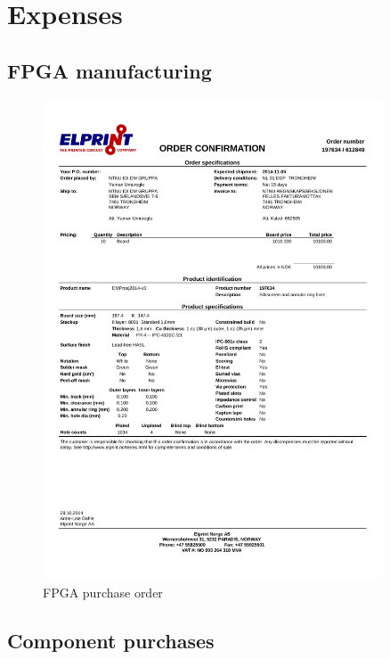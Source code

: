 \documentclass[../main/report.tex]{subfiles}
\begin{document}
\chapter{Expenses}

\section{FPGA manufacturing}

\begin{figure}[H]
   \centering
   \includegraphics[width=0.9\textwidth]{../appendix/assets/FPGA-purchase.pdf}
   \caption{FPGA purchase order}
   \label{fig:FPGA_order}
\end{figure}

\section{Component purchases}
\end{document}
